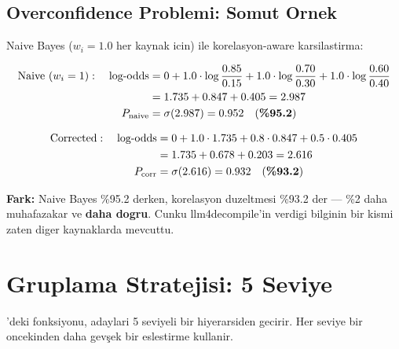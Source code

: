 \subsection{Overconfidence Problemi: Somut Ornek}

Naive Bayes ($w_i = 1.0$ her kaynak icin) ile korelasyon-aware karsilastirma:

\begin{align}
\text{Naive } (w_i = 1): \quad \text{log-odds} &= 0 + 1.0 \cdot \log\frac{0.85}{0.15} + 1.0 \cdot \log\frac{0.70}{0.30} + 1.0 \cdot \log\frac{0.60}{0.40} \\
&= 1.735 + 0.847 + 0.405 = 2.987 \\
P_{\text{naive}} &= \sigma(2.987) = 0.952 \quad (\text{\textbf{\%95.2}})
\end{align}

\begin{align}
\text{Corrected}: \quad \text{log-odds} &= 0 + 1.0 \cdot 1.735 + 0.8 \cdot 0.847 + 0.5 \cdot 0.405 \\
&= 1.735 + 0.678 + 0.203 = 2.616 \\
P_{\text{corr}} &= \sigma(2.616) = 0.932 \quad (\text{\textbf{\%93.2}})
\end{align}

\textbf{Fark:} Naive Bayes \%95.2 derken, korelasyon duzeltmesi \%93.2 der --- \%2 daha muhafazakar ve \textbf{daha dogru}. Cunku llm4decompile'in verdigi bilginin bir kismi zaten diger kaynaklarda mevcuttu.


\section{Gruplama Stratejisi: 5 Seviye}
\label{sec:grouping-detail}

'deki  fonksiyonu, adaylari 5 seviyeli bir hiyerarsiden gecirir. Her seviye bir oncekinden daha gevşek bir eslestirme kullanir.

